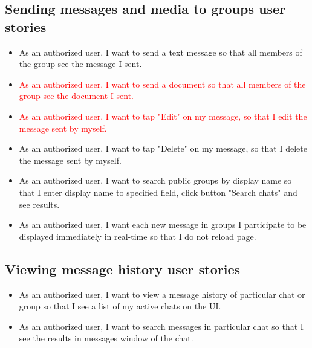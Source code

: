 \subsection{Sending messages and media to groups user stories}
\label{subsec:sending-messages-and-media-to-groups}
\begin{itemize}
    \item As an authorized user, I want to send a text message so that all members of the group see the message I sent.
    \item \textcolor{red}{As an authorized user, I want to send a document so that all members of the group see the document I sent.}
    \item \textcolor{red}{As an authorized user, I want to tap "Edit" on my message, so that I edit the message sent by myself.}
    \item As an authorized user, I want to tap "Delete" on my message, so that I delete the message sent by myself.
    \item As an authorized user, I want to search public groups by display name so that I enter display name to specified field, click button "Search chats" and see results.
    \item As an authorized user, I want each new message in groups I participate to be displayed immediately in
    real-time so that I do not reload page.
\end{itemize}

\subsection{Viewing message history user stories}\label{subsec:viewing-message-history-feature-user-stories}
\begin{itemize}
    \item As an authorized user, I want to view a message history of particular chat or group so that I see a list of my active chats on the UI\@.
    \item As an authorized user, I want to search messages in particular chat so that I see the results in messages window of the chat.
\end{itemize}

